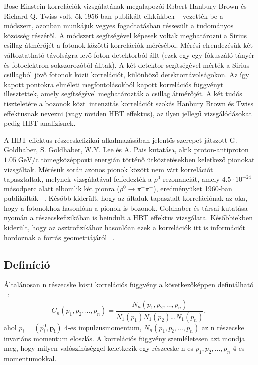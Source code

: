 \documentclass[10pt,a4paper]{article}
\numberwithin{equation}{subsection}
\numberwithin{figure}{section}
\begin{document}
Bose-Einstein korrelációk vizsgálatának megalapozói Robert Hanbury Brown és Richard Q. Twiss volt, ők 1956-ban publikált cikkükben ~\cite{HanburyBrown:1956bqd} vezették be a módszert, azonban munkájuk vegyes fogadtatásban részesült a tudományos közösség részéről. A módszert segítségével képesek voltak meghatározni a Sirius csillag átmérőjét a fotonok közötti korrelációk méréséből. Mérési elrendezésük két változtatható távolságra levő foton detektorból állt (ezek egy-egy fókuszáló tányér és fotoelektron sokszorozóból álltak). A két detektor segítségével mérték a Sirius csillagból jövő fotonok közti korrelációt, különböző detektortávolságokon. Az így kapott pontokra elméleti megfontolásokból kapott korrelációs függvényt illesztettek, amely segítségével meghatározták a csillag átmérőjét. A két tudós tiszteletére a bozonok közti intenzitás korrelációt szokás Hanbury Brown és Twiss effektusnak nevezni (vagy röviden HBT effektus), az ilyen jellegű vizsgálódásokat pedig HBT analízisnek.

A HBT effektus részecskefizikai alkalmazásában jelentős szerepet játszott G. Goldhaber, S. Goldhaber, W.Y. Lee és A. Pais kutatása, akik proton-antiproton $1.05\;\mathrm{GeV/c}$ tömegközépponti energián történő ütköztetésekben keletkező pionokat vizsgáltak. Mérésük során azonos pionok között nem várt korrelációt tapasztaltak, melynek vizsgálatával felfedezték a $\rho^0$ rezonanciát, amely $4.5\cdot 10^{-24}$ másodperc alatt elbomlik két pionra ($\rho^0\rightarrow \pi^+\pi^-$), eredményüket 1960-ban publikálták ~\cite{Goldhaber:1960sf}. Később kiderült, hogy az általuk tapasztalt korrelációnak az oka, hogy a fotonokhoz hasonlóan a pionok is bozonok. Goldhaber és társai kutatása nyomán a részecskefizikában is beindult a HBT effektus vizsgálata. Későbbiekben kiderült, hogy az asztrofizikához hasonlóan ezek a korrelációk itt is információt hordoznak a forrás geometriájáról ~\cite{Padula:2004ba}. 


\subsection{Definíció}

Általánosan n részecske közti korrelációs függvény a következőképpen definiálható ~\cite{Alt:1999cs, Csorgo:1999sj}:
\begin{equation}
C_n(p_1, p_2, \dots, p_n)=\frac{ N_n(p_1, p_2, \dots, p_n)  }{ N_1(p_1)N_1(p_2)\dots N_1(p_n)},
\label{eq:Cn}
\end{equation}
ahol $p_i=(p_i^0, \bm{p_i})$ 4-es impulzusmomentum, $ N_n(p_1, p_2, \dots, p_n)$ az n részecske invariáns momentum eloszlás. A korrelációs függvény szemléletesen azt mondja meg, hogy milyen valószínűséggel keletkezik egy részecske n-es $p_1, p_2, \dots, p_n$ 4-es momentumokkal.
\end{document}
